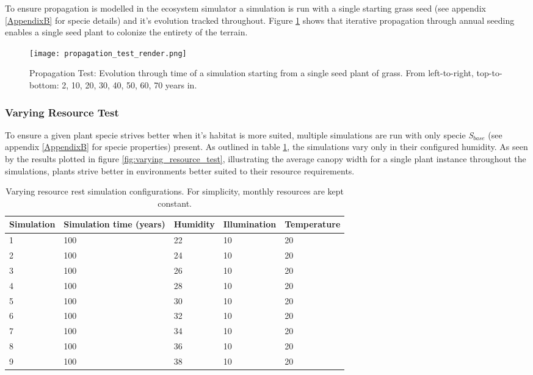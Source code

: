 To ensure propagation is modelled in the ecosystem simulator a simulation is run with a single starting grass seed (see appendix \ref{AppendixB} for specie details) and it's evolution tracked throughout. Figure \ref{fig:propagation_test_render} shows that iterative propagation through annual seeding enables a single seed plant to colonize the entirety of the terrain. 

\begin{figure}
\center
	\texttt{[image: propagation\_test\_render.png]}
	\caption{ Propagation Test: Evolution through time of a simulation starting from a single seed plant of grass. From left-to-right, top-to-bottom: 2, 10, 20, 30, 40, 50, 60, 70 years in.}
	\label{fig:propagation_test_render}
\end{figure}

\subsubsection{Varying Resource Test}

To ensure a given plant specie strives better when it's habitat is more suited, multiple simulations are run with only specie \textit{S$_{base}$} (see appendix \ref{AppendixB} for specie properties) present. As outlined in table \ref{tab:varying_resource_test_simulations}, the simulations vary only in their configured humidity. As seen by the results plotted in figure \ref{fig:varying_resource_test}, illustrating the average canopy width for a single plant instance throughout the simulations, plants strive better in environments better suited to their resource requirements.

\begin{table}[]
  \centering
	    \begin{tabular}{|p{3cm}|p{3cm}|p{3cm}|p{3cm}|p{3cm}|}
		\hline
		\textbf{Simulation} & \textbf{Simulation time (years)} & \textbf{Humidity} & \textbf{Illumination} & \textbf{Temperature}\\
		\hline         
		1 & 100 & 22 & 10 & 20\\           
		\hline       
		2 & 100 & 24 & 10 & 20\\
		\hline       
		3 & 100 & 26 & 10 & 20\\           
		\hline     
		4 & 100 & 28 & 10 & 20\\           
		\hline     
		5 & 100 & 30 & 10 & 20\\           
		\hline       
		6 & 100 & 32 & 10 & 20\\           
		\hline       
		7 & 100 & 34 & 10 & 20\\           
		\hline      
		8 & 100 & 36 & 10 & 20\\           
		\hline       
		9 & 100 & 38 & 10 & 20\\           
		\hline     
		\end{tabular}
		\caption{Varying resource rest simulation configurations. For simplicity, monthly resources are kept constant.}
		\label{tab:varying_resource_test_simulations}
\end{table}


